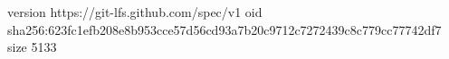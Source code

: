 version https://git-lfs.github.com/spec/v1
oid sha256:623fc1efb208e8b953cce57d56cd93a7b20c9712c7272439c8c779cc77742df7
size 5133
